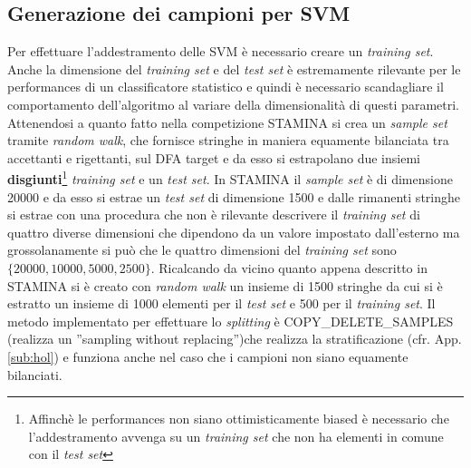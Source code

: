 \subsection{Generazione dei campioni per SVM}
\label{sub:csvm}
Per effettuare l'addestramento delle \ac{SVM} è necessario creare un \textit{training set}. Anche la dimensione del \textit{training set} e del \textit{test set} è estremamente rilevante per le performances di un classificatore statistico e quindi è necessario scandagliare il comportamento dell'algoritmo al variare della dimensionalità di questi parametri. Attenendosi a quanto fatto nella competizione STAMINA \cite{Stamina10} si crea un \textit{sample set} tramite \textit{random walk}, che fornisce stringhe in maniera equamente bilanciata tra accettanti e rigettanti, sul \ac{DFA} target e da esso si estrapolano due insiemi \textbf{disgiunti}\footnote{Affinchè le performances non siano ottimisticamente biased è necessario che l'addestramento avvenga su un \textit{training set} che non ha elementi in comune con il \textit{test set}} \textit{training set} e un \textit{test set}. In STAMINA il \textit{sample set} è di dimensione 20000 e da esso si estrae un \textit{test set} di dimensione 1500 e dalle rimanenti stringhe si estrae con una procedura che non è rilevante descrivere il \textit{training set} di quattro diverse dimensioni che dipendono da un valore impostato dall'esterno ma grossolanamente si può che le quattro dimensioni del \textit{training set} sono $\{20000,10000,5000,2500\}$. Ricalcando da vicino quanto appena descritto in STAMINA si è creato con \textit{random walk} un insieme di 1500 stringhe da cui si è estratto un insieme di 1000 elementi per il \textit{test set} e 500 per il \textit{training set}. Il metodo implementato per effettuare lo \textit{splitting} è COPY\_DELETE\_SAMPLES (realizza un ''sampling without replacing'')che realizza la stratificazione (cfr. App. \ref{sub:hol}) e funziona anche nel caso che i campioni non siano equamente bilanciati.
